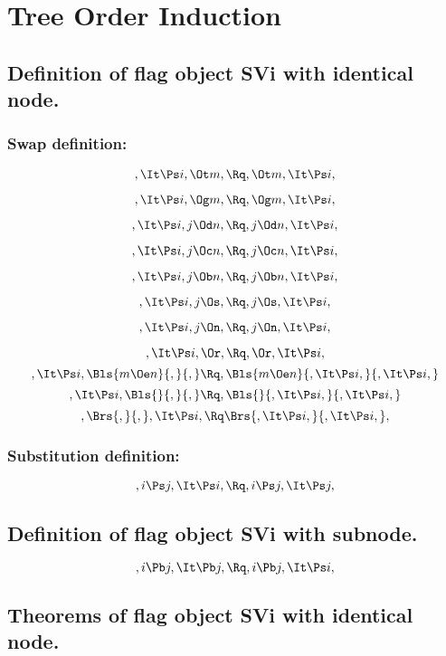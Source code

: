
\chapter{Tree Order Induction}
\section{Definition of flag object SVi with identical node.}



\subsection{Swap definition:}
\[,\It \Ps i, \Ot m, \Rq , \Ot m, \It \Ps i,\]

\[,\It \Ps i, \Og m, \Rq , \Og m, \It \Ps i,\]

\[,\It \Ps i, j \Od n, \Rq , j \Od n, \It \Ps i,\]

\[,\It \Ps i, j \Oc n, \Rq , j \Oc n, \It \Ps i,\]

\[,\It \Ps i, j \Ob n, \Rq , j \Ob n, \It \Ps i,\]

\[,\It \Ps i, j \Os, \Rq , j \Os, \It \Ps i,\]

\[,\It \Ps i, j \On, \Rq , j \On, \It \Ps i,\]

\[,\It \Ps i, \Or, \Rq , \Or, \It \Ps i,\]
\bigskip
\[,\It \Ps i, \Bls{m \Oe n}{,}{,} \Rq , \Bls{m \Oe n}{,\It \Ps i,}{,\It \Ps i,}\]
\bigskip
\[,\It \Ps i, \Bls{}{,}{,} \Rq , \Bls{}{,\It \Ps i,}{,\It \Ps i,}\]
\bigskip
\[, \Brs{,}{,},\It \Ps i, \Rq \Brs{,\It \Ps i,}{,\It \Ps i,},\]



\bigskip
\bigskip
\subsection{Substitution definition:}
\[,i \Ps j, \It \Ps i, \Rq , i\Ps j, \It \Ps j,\]



\bigskip
\bigskip
\bigskip
\bigskip
\section{Definition of flag object SVi with subnode.}
\[, i \Pb j, \It \Pb j, \Rq , i \Pb j, \It \Ps i,\]



\bigskip
\bigskip
\bigskip
\bigskip
\section{Theorems of flag object SVi with identical node.}

